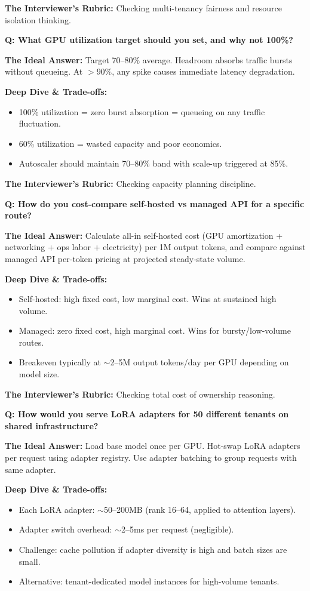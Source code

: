 \textbf{The Interviewer's Rubric:} Checking multi-tenancy fairness and resource isolation thinking.

\textbf{Q: What GPU utilization target should you set, and why not 100\%?}

\textbf{The Ideal Answer:} Target 70--80\% average. Headroom absorbs traffic bursts without queueing. At $>$90\%, any spike causes immediate latency degradation.

\textbf{Deep Dive \& Trade-offs:}
\begin{itemize}
  \item 100\% utilization = zero burst absorption = queueing on any traffic fluctuation.
  \item 60\% utilization = wasted capacity and poor economics.
  \item Autoscaler should maintain 70--80\% band with scale-up triggered at 85\%.
\end{itemize}

\textbf{The Interviewer's Rubric:} Checking capacity planning discipline.

\textbf{Q: How do you cost-compare self-hosted vs managed API for a specific route?}

\textbf{The Ideal Answer:} Calculate all-in self-hosted cost (GPU amortization + networking + ops labor + electricity) per 1M output tokens, and compare against managed API per-token pricing at projected steady-state volume.

\textbf{Deep Dive \& Trade-offs:}
\begin{itemize}
  \item Self-hosted: high fixed cost, low marginal cost. Wins at sustained high volume.
  \item Managed: zero fixed cost, high marginal cost. Wins for bursty/low-volume routes.
  \item Breakeven typically at $\sim$2--5M output tokens/day per GPU depending on model size.
\end{itemize}

\textbf{The Interviewer's Rubric:} Checking total cost of ownership reasoning.

\textbf{Q: How would you serve LoRA adapters for 50 different tenants on shared infrastructure?}

\textbf{The Ideal Answer:} Load base model once per GPU. Hot-swap LoRA adapters per request using adapter registry. Use adapter batching to group requests with same adapter.

\textbf{Deep Dive \& Trade-offs:}
\begin{itemize}
  \item Each LoRA adapter: $\sim$50--200MB (rank 16--64, applied to attention layers).
  \item Adapter switch overhead: $\sim$2--5ms per request (negligible).
  \item Challenge: cache pollution if adapter diversity is high and batch sizes are small.
  \item Alternative: tenant-dedicated model instances for high-volume tenants.
\end{itemize}

